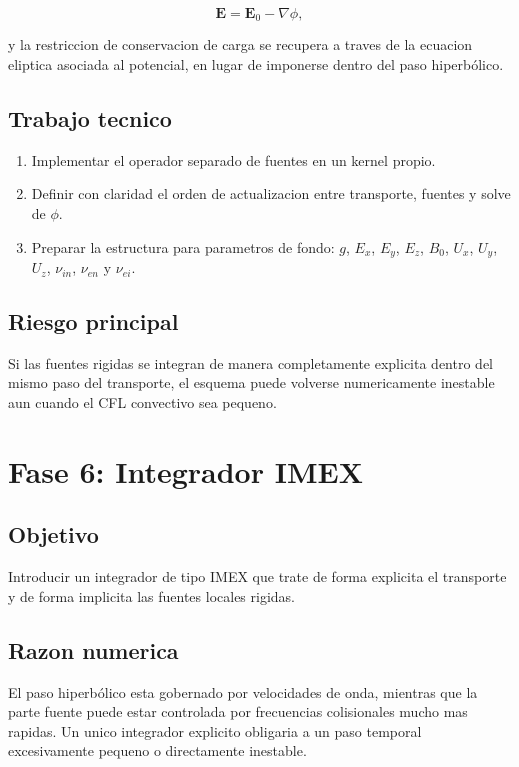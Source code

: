 \documentclass[11pt]{article}
\begin{document}
\begin{equation}
\mathbf{E} = \mathbf{E}_0 - \nabla \phi,
\end{equation}

y la restriccion de conservacion de carga se recupera a traves de la ecuacion eliptica asociada al potencial, en lugar de imponerse dentro del paso hiperb\'olico.

\subsection*{Trabajo tecnico}

\begin{enumerate}[label=\arabic*.]
    \item Implementar el operador separado de fuentes en un kernel propio.
    \item Definir con claridad el orden de actualizacion entre transporte, fuentes y solve de $\phi$.
    \item Preparar la estructura para parametros de fondo: $g$, $E_x$, $E_y$, $E_z$, $B_0$, $U_x$, $U_y$, $U_z$, $\nu_{in}$, $\nu_{en}$ y $\nu_{ei}$.
\end{enumerate}

\subsection*{Riesgo principal}

Si las fuentes rigidas se integran de manera completamente explicita dentro del mismo paso del transporte, el esquema puede volverse numericamente inestable aun cuando el CFL convectivo sea pequeno.

\section{Fase 6: Integrador IMEX}

\subsection*{Objetivo}

Introducir un integrador de tipo IMEX que trate de forma explicita el transporte y de forma implicita las fuentes locales rigidas.

\subsection*{Razon numerica}

El paso hiperb\'olico esta gobernado por velocidades de onda, mientras que la parte fuente puede estar controlada por frecuencias colisionales mucho mas rapidas. Un unico integrador explicito obligaria a un paso temporal excesivamente pequeno o directamente inestable.
\end{document}
